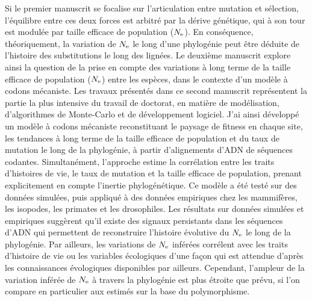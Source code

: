 Si le premier manuscrit se focalise sur l'articulation entre mutation et sélection, l'équilibre entre ces deux forces est arbitré par la dérive génétique, qui à son tour est modulée par taille efficace de population ($N_{\textrm{e}}$).
En conséquence, théoriquement, la variation de $N_{\textrm{e}}$ le long d'une phylogénie peut être déduite de l'histoire des substitutions le long des lignées.
Le deuxième manuscrit explore ainsi la question de la prise en compte des variations à long terme de la taille efficace de population ($N_{\textrm{e}}$) entre les espèces, dans le contexte d'un modèle à codons mécaniste.
Les travaux présentés dans ce second manuscrit représentent la partie la plus intensive du travail de doctorat, en matière de modélisation, d'algorithmes de Monte-Carlo et de développement logiciel.
J'ai ainsi développé un modèle à codons mécaniste reconstituant le paysage de fitness en chaque site, les tendances à long terme de la taille efficace de population et du taux de mutation le long de la phylogénie, à partir d’alignements d'ADN de séquences codantes.
Simultanément, l'approche estime la corrélation entre les traits d’histoires de vie, le taux de mutation et la taille efficace de population, prenant explicitement en compte l'inertie phylogénétique.
Ce modèle a été testé sur des données simulées, puis appliqué à des données empiriques chez les mammifères, les isopodes, les primates et les drosophiles.
Les résultats sur données simulées et empiriques suggèrent qu'il existe des signaux persistants dans les séquences d’ADN qui permettent de reconstruire l'histoire évolutive du $N_{\textrm{e}}$ le long de la phylogénie.
Par ailleurs, les variations de $N_{\textrm{e}}$ inférées corrélent avec les traits d’histoire de vie ou les variables écologiques d'une façon qui est attendue d'après les connaissances évologiques disponibles par ailleurs.
Cependant, l'ampleur de la variation inférée de $N_{\textrm{e}}$ à travers la phylogénie est plus étroite que prévu, si l'on compare en particulier aux estimés sur la base du polymorphisme.

